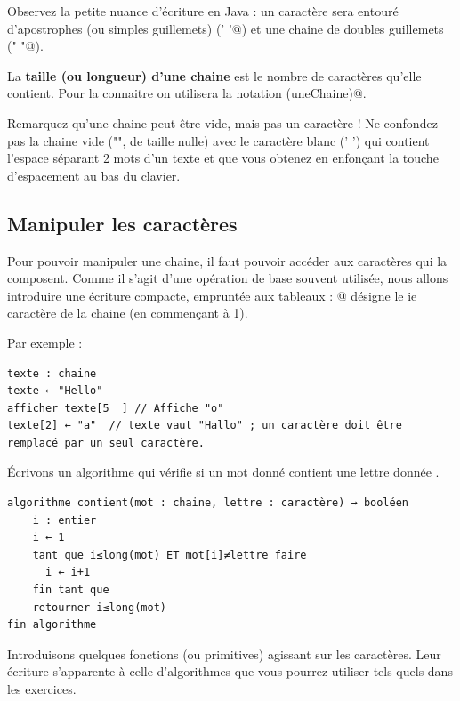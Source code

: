 \documentclass[11pt,a4paper]{article}
\begin{document}
        Observez la petite nuance d'\'ecriture en Java : 
        un caract\`ere sera entour\'e d'apostrophes (ou simples guillemets) (\verb@’ ’@) 
        et une chaine de doubles guillemets (\verb@" "@).
      
            \par
        
        La \textbf{taille (ou longueur) d'une chaine} est le nombre de caract\`eres qu'elle contient. 
        Pour la connaitre on utilisera la notation \verb@long(uneChaine)@.
      
            \par
        
        Remarquez qu'une chaine peut \^etre vide, mais pas un caract\`ere ! Ne confondez pas la chaine vide ("", de
        taille nulle) avec le caract\`ere blanc (' ') qui contient l'espace s\'eparant 2 mots d'un texte et
        que vous obtenez en enfon\c cant la touche d'espacement au bas du clavier.
		
            \par
        \subsection{Manipuler les caract\`eres}
		    Pour pouvoir manipuler une chaine, il faut pouvoir acc\'eder aux caract\`eres qui la composent.
        Comme il s'agit d'une op\'eration de base souvent utilis\'ee, nous allons introduire une \'ecriture 
        compacte, emprunt\'ee aux tableaux : \verb@nomChaine[i]@ 
        d\'esigne le ie caract\`ere de la chaine \verb@nomChaine@ (en commen\c cant \`a 1).
		  
            \par
        
		    Par exemple :
		  
            \par
        \begin{verbatim}
texte : chaine
texte ← "Hello"
afficher texte[5  ] // Affiche "o"
texte[2] ← "a"  // texte vaut "Hallo" ; un caractère doit être remplacé par un seul caractère.
		  \end{verbatim}
		    \'Ecrivons un algorithme qui v\'erifie si un mot donn\'e contient une lettre donn\'ee
      .
            \par
        \begin{verbatim}
algorithme contient(mot : chaine, lettre : caractère) → booléen
    i : entier
    i ← 1
    tant que i≤long(mot) ET mot[i]≠lettre faire
      i ← i+1
    fin tant que
    retourner i≤long(mot)
fin algorithme
		  \end{verbatim}
        Introduisons quelques fonctions (ou primitives) agissant sur les caract\`eres. Leur \'ecriture
        s'apparente \`a celle d'algorithmes que vous pourrez utiliser tels quels dans les exercices. 
      
\end{document}
